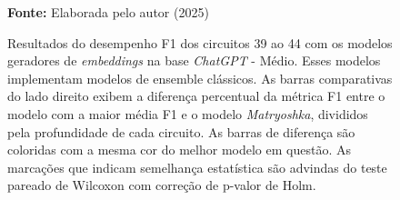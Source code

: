 \begin{figure}
\caption{Resultados do desempenho F1 dos circuitos 39 ao 44 com os modelos geradores de \textit{embeddings} na base \textit{ChatGPT} - Médio. Esses modelos implementam modelos de ensemble clássicos. As barras comparativas do lado direito exibem a diferença percentual da métrica F1 entre o modelo com a maior média F1 e o modelo \textit{Matryoshka}, divididos pela profundidade de cada circuito. As barras de diferença são coloridas com a mesma cor do melhor modelo em questão. As marcações que indicam semelhança estatística são advindas do teste pareado de Wilcoxon com correção de p-valor de Holm.}
\label{fig:model_transformer:medium:g8}
     \centering
    \centering

      \par\medskip\ABNTEXfontereduzida\selectfont\textbf{Fonte:} Elaborada pelo autor (2025) \par\medskip
\end{figure}